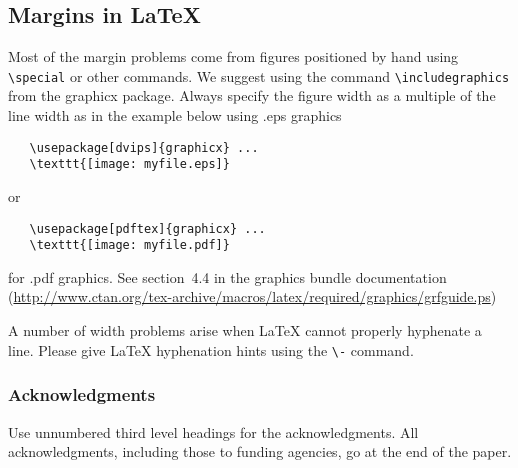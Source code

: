 \documentclass{article} %
\begin{document}
\subsection{Margins in LaTeX}

Most of the margin problems come from figures positioned by hand using
\verb+\special+ or other commands. We suggest using the command
\verb+\includegraphics+
from the graphicx package. Always specify the figure width as a multiple of
the line width as in the example below using .eps graphics
\begin{verbatim}
   \usepackage[dvips]{graphicx} ...
   \texttt{[image: myfile.eps]}
\end{verbatim}
or %
\begin{verbatim}
   \usepackage[pdftex]{graphicx} ...
   \texttt{[image: myfile.pdf]}
\end{verbatim}
for .pdf graphics.
See section~4.4 in the graphics bundle documentation (\url{http://www.ctan.org/tex-archive/macros/latex/required/graphics/grfguide.ps})

A number of width problems arise when LaTeX cannot properly hyphenate a
line. Please give LaTeX hyphenation hints using the \verb+\-+ command.


\subsubsection*{Acknowledgments}

Use unnumbered third level headings for the acknowledgments. All
acknowledgments, including those to funding agencies, go at the end of the paper.



\end{document}
